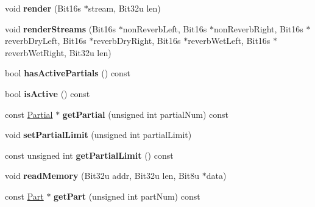 \begin{DoxyCompactItemize}
\item 
\hypertarget{classMT32Emu_1_1Synth_aacfb514fc017b0345fda64604e789ee3}{void {\bfseries render} (Bit16s $\ast$stream, Bit32u len)}\label{classMT32Emu_1_1Synth_aacfb514fc017b0345fda64604e789ee3}

\item 
\hypertarget{classMT32Emu_1_1Synth_a7fb364b4ed786c936ed1f32d5b288686}{void {\bfseries render\-Streams} (Bit16s $\ast$non\-Reverb\-Left, Bit16s $\ast$non\-Reverb\-Right, Bit16s $\ast$reverb\-Dry\-Left, Bit16s $\ast$reverb\-Dry\-Right, Bit16s $\ast$reverb\-Wet\-Left, Bit16s $\ast$reverb\-Wet\-Right, Bit32u len)}\label{classMT32Emu_1_1Synth_a7fb364b4ed786c936ed1f32d5b288686}

\item 
\hypertarget{classMT32Emu_1_1Synth_aa15be06933c2f0cdc5cbe024cd4ac103}{bool {\bfseries has\-Active\-Partials} () const }\label{classMT32Emu_1_1Synth_aa15be06933c2f0cdc5cbe024cd4ac103}

\item 
\hypertarget{classMT32Emu_1_1Synth_a64e851964873f6563c4f72b392de18c2}{bool {\bfseries is\-Active} () const }\label{classMT32Emu_1_1Synth_a64e851964873f6563c4f72b392de18c2}

\item 
\hypertarget{classMT32Emu_1_1Synth_a3918ce533d2b22381daa3fce0e533e67}{const \hyperlink{classMT32Emu_1_1Partial}{Partial} $\ast$ {\bfseries get\-Partial} (unsigned int partial\-Num) const }\label{classMT32Emu_1_1Synth_a3918ce533d2b22381daa3fce0e533e67}

\item 
\hypertarget{classMT32Emu_1_1Synth_a2f629ad08ed00fdc79f113142932152a}{void {\bfseries set\-Partial\-Limit} (unsigned int partial\-Limit)}\label{classMT32Emu_1_1Synth_a2f629ad08ed00fdc79f113142932152a}

\item 
\hypertarget{classMT32Emu_1_1Synth_a8310ea4dcb18c3b2961589f245ad5e5c}{const unsigned int {\bfseries get\-Partial\-Limit} () const }\label{classMT32Emu_1_1Synth_a8310ea4dcb18c3b2961589f245ad5e5c}

\item 
\hypertarget{classMT32Emu_1_1Synth_a05967518ce744420fa83491a630007c8}{void {\bfseries read\-Memory} (Bit32u addr, Bit32u len, Bit8u $\ast$data)}\label{classMT32Emu_1_1Synth_a05967518ce744420fa83491a630007c8}

\item 
\hypertarget{classMT32Emu_1_1Synth_a0eb07100db7746a7eb2393e12147db98}{const \hyperlink{classMT32Emu_1_1Part}{Part} $\ast$ {\bfseries get\-Part} (unsigned int part\-Num) const }\label{classMT32Emu_1_1Synth_a0eb07100db7746a7eb2393e12147db98}


\end{DoxyCompactItemize}
